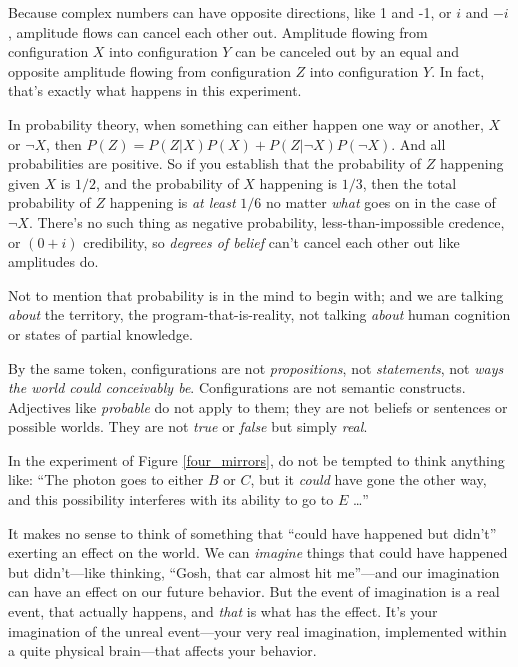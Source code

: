 {
 Because complex numbers can have opposite directions, like 1 and
-1, or $i$ and $-i$, amplitude flows can cancel each other out. Amplitude
flowing from configuration $X$ into configuration $Y$ can be canceled out
by an equal and opposite amplitude flowing from configuration $Z$ into
configuration $Y$. In fact, that's exactly what happens
in this experiment.}

{
 In probability theory, when something can either happen one way or
another, $X$ or $\lnot X$, then $P(Z) = P(Z|X)P(X) +
P(Z|\lnot X)P(\lnot X)$. And all probabilities are
positive. So if you establish that the probability of $Z$ happening given
$X$ is $1/2$, and the probability of $X$ happening is $1/3$, then the total
probability of $Z$ happening is \textit{at least} $1/6$ no matter
\textit{what} goes on in the case of $\lnot X$.
There's no such thing as negative probability,
less-than-impossible credence, or $(0 + i)$ credibility, so
\textit{degrees of belief} can't cancel each other out
like amplitudes do.}

{
 Not to mention that probability is in the mind to begin with; and
we are talking \textit{about} the territory, the
program-that-is-reality, not talking \textit{about} human cognition or
states of partial knowledge.}

{
 By the same token, configurations are not \textit{propositions},
not \textit{statements}, not \textit{ways the world could conceivably
be}. Configurations are not semantic constructs. Adjectives like
\textit{probable} do not apply to them; they are not beliefs or
sentences or possible worlds. They are not \textit{true} or
\textit{false} but simply \textit{real}.}

{
 In the experiment of Figure \ref{four_mirrors}, do not be tempted to think
anything like: ``The photon goes to either $B$ or $C$, but
it \textit{could} have gone the other way, and this possibility
interferes with its ability to go to $E$ \ldots''}

{
 It makes no sense to think of something that
``could have happened but
didn't'' exerting an effect on the
world. We can \textit{imagine} things that could have happened but
didn't---like thinking, ``Gosh, that
car almost hit me''---and our imagination can have an
effect on our future behavior. But the event of imagination is a real
event, that actually happens, and \textit{that} is what has the effect.
It's your imagination of the unreal event---your very
real imagination, implemented within a quite physical brain---that
affects your behavior.}

